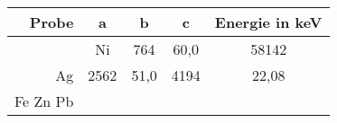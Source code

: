 \begin{tabular}{rcccc}
\toprule
Probe&a&b&c&Energie in keV\\
\midrule
&
Ni&764&60,0&58142&\\
Ag&2562&51,0&4194&22,08\\
Fe
Zn
Pb
\bottomrule
\end{tabular}